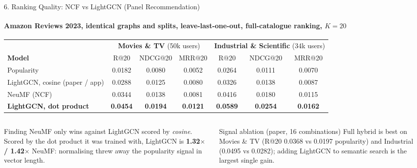 \documentclass[aspectratio=169, 11pt]{beamer}
\begin{document}
\begin{frame}{6. Ranking Quality: NCF vs LightGCN (Panel Recommendation)}
    \framesubtitle{Amazon Reviews 2023, identical graphs and splits, leave-last-one-out, full-catalogue ranking, $K=20$}
    \centering
    \scriptsize
    \renewcommand{\arraystretch}{1.2}
    \begin{tabular}{l ccc ccc}
        \toprule
        & \multicolumn{3}{c}{\textbf{Movies \& TV} (50k users)} & \multicolumn{3}{c}{\textbf{Industrial \& Scientific} (34k users)} \\
        \cmidrule(lr){2-4}\cmidrule(lr){5-7}
        \textbf{Model} & R@20 & NDCG@20 & MRR@20 & R@20 & NDCG@20 & MRR@20 \\
        \midrule
        Popularity & 0.0182 & 0.0080 & 0.0052 & 0.0264 & 0.0111 & 0.0070 \\
        LightGCN, cosine (paper / app) & 0.0288 & 0.0125 & 0.0080 & 0.0326 & 0.0138 & 0.0087 \\
        NeuMF (NCF) & 0.0344 & 0.0138 & 0.0081 & 0.0416 & 0.0180 & 0.0115 \\
        \textbf{LightGCN, dot product} & \textbf{0.0454} & \textbf{0.0194} & \textbf{0.0121} & \textbf{0.0589} & \textbf{0.0254} & \textbf{0.0162} \\
        \bottomrule
    \end{tabular}

    \vspace{0.3cm}
    \begin{columns}[T]
        \begin{block}{Finding}
            \scriptsize NeuMF only wins against LightGCN scored by \emph{cosine}. Scored by the dot product it was trained with, LightGCN is \textbf{1.32$\times$ / 1.42$\times$} NeuMF: normalising threw away the popularity signal in vector length.
        \end{block}
        \begin{block}{Signal ablation (paper, 16 combinations)}
            \scriptsize Full hybrid is best on Movies \& TV (R@20 0.0368 vs 0.0197 popularity) and Industrial (0.0495 vs 0.0282); adding LightGCN to semantic search is the largest single gain.
        \end{block}
    \end{columns}
\end{frame}
\end{document}
